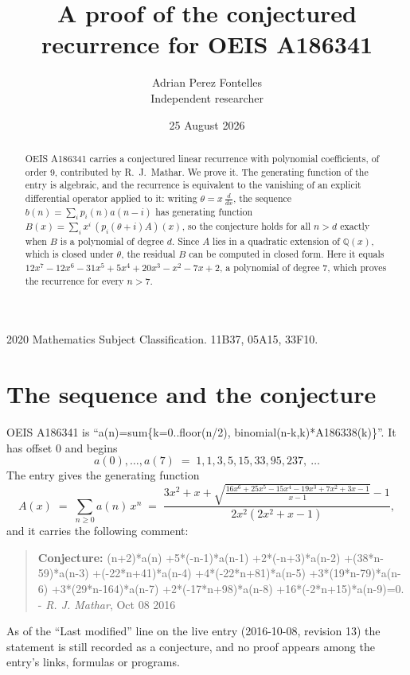 \documentclass[11pt,a4paper]{article}
\title{A proof of the conjectured recurrence for OEIS A186341}
\author{Adrian Perez Fontelles\\ \small Independent researcher}
\date{25 August 2026}
\theoremstyle{plain}
\theoremstyle{definition}
\begin{document}
\maketitle

\begin{abstract}
OEIS A186341 carries a conjectured linear recurrence with polynomial coefficients, of
order 9, contributed by R.~J.~Mathar. We prove it. The generating function of the
entry is algebraic, and the recurrence is equivalent to the vanishing of an explicit
differential operator applied to it: writing $\theta=x\,\frac{d}{dx}$, the sequence
$b(n)=\sum_{i}p_{i}(n)a(n-i)$ has generating function
$B(x)=\sum_{i}x^{i}\,(p_{i}(\theta+i)A)(x)$, so the conjecture holds for all $n>d$ exactly
when $B$ is a polynomial of degree $d$. Since $A$ lies in a quadratic extension of
$\mathbb{Q}(x)$, which is closed under $\theta$, the residual $B$ can be computed in
closed form. Here it equals $12 x^{7} - 12 x^{6} - 31 x^{5} + 5 x^{4} + 20 x^{3} - x^{2} - 7 x + 2$, a polynomial of degree $7$, which proves
the recurrence for every $n>7$.
\end{abstract}

\noindent\small 2020 Mathematics Subject Classification. 11B37, 05A15, 33F10.\normalsize

\section{The sequence and the conjecture}

OEIS A186341 is ``a(n)=sum\{k=0..floor(n/2), binomial(n-k,k)*A186338(k)\}''. It has offset $0$ and begins
\[
a(0),\dots,a(7)\;=\;1, 1, 3, 5, 15, 33, 95, 237,\ \dots
\]
The entry gives the generating function
\begin{equation}\label{eq:gf}
A(x)\;=\;\sum_{n\ge 0} a(n)\,x^{n}\;=\;\frac{3 x^{2} + x + \sqrt{\frac{16 x^{6} + 25 x^{5} - 15 x^{4} - 19 x^{3} + 7 x^{2} + 3 x - 1}{x - 1}} - 1}{2 x^{2} \left(2 x^{2} + x - 1\right)} ,
\end{equation}
and it carries the following comment:
\begin{quote}\small
\textbf{Conjecture:} (n+2)*a(n) +5*(-n-1)*a(n-1) +2*(-n+3)*a(n-2) +(38*n-59)*a(n-3) +(-22*n+41)*a(n-4) +4*(-22*n+81)*a(n-5) +3*(19*n-79)*a(n-6) +3*(29*n-164)*a(n-7) +2*(-17*n+98)*a(n-8) +16*(-2*n+15)*a(n-9)=0. - \emph{R. J. Mathar}, Oct 08 2016
\end{quote}
As of the ``Last modified'' line on the live entry (2016-10-08, revision 13) the
statement is still recorded as a conjecture, and no proof appears among the entry's links,
formulas or programs.
\end{document}

